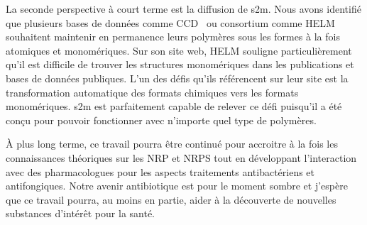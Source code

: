 La seconde perspective à court terme est la diffusion de s2m.
Nous avons identifié que plusieurs bases de données comme CCD~\cite{rahman_small_2009} ou consortium comme HELM~\cite{_helm_????} souhaitent maintenir en permanence leurs polymères sous les formes à la fois atomiques et monomériques.
Sur son site web, HELM souligne particulièrement qu'il est difficile de trouver les structures monomériques dans les publications et bases de données publiques.
L'un des défis qu'ils référencent sur leur site est la transformation automatique des formats chimiques vers les formats monomériques.
s2m est parfaitement capable de relever ce défi puisqu'il a été conçu pour pouvoir fonctionner avec n'importe quel type de polymères.

À plus long terme, ce travail pourra être continué pour accroitre à la fois les connaissances théoriques sur les NRP et NRPS tout en développant l'interaction avec des pharmacologues pour les aspects traitements antibactériens et antifongiques.
Notre avenir antibiotique est pour le moment sombre et j'espère que ce travail pourra, au moins en partie, aider à la découverte de nouvelles substances d'intérêt pour la santé.


























